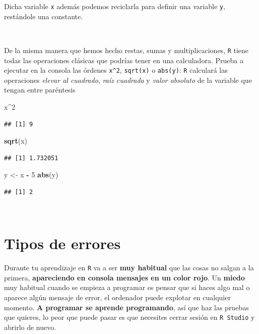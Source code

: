 \documentclass[11pt,]{book}
\newenvironment{Shaded}{\begin{snugshade}}{\end{snugshade}}
\newcommand{\DecValTok}[1]{\textcolor[rgb]{0.06,0.06,0.06}{#1}}
\newcommand{\KeywordTok}[1]{\textcolor[rgb]{0.27,0.27,0.27}{\textbf{#1}}}
\newcommand{\NormalTok}[1]{#1}
\newcommand{\OperatorTok}[1]{\textcolor[rgb]{0.43,0.43,0.43}{\textbf{#1}}}
\newcommand{\StringTok}[1]{\textcolor[rgb]{0.5,0.5,0.5}{#1}}
\begin{document}
Dicha variable \texttt{x} además podemos reciclarla para definir una variable \texttt{y}, restándole una constante.

~

De la misma manera que hemos hecho restas, sumas y multiplicaciones, \texttt{R} tiene todas las operaciones clásicas que podrías tener en una calculadora. Prueba a ejecutar en la consola las órdenes \texttt{x\^{}2}, \texttt{sqrt(x)} o \texttt{abs(y)}: \texttt{R} calculará las operaciones \emph{elevar al cuadrado}, \emph{raíz cuadrada} y \emph{valor absoluto} de la variable que tengan entre paréntesis

\begin{Shaded}
\begin{Highlighting}[]
\NormalTok{x}\OperatorTok{^}\DecValTok{2}
\end{Highlighting}
\end{Shaded}

\begin{verbatim}
## [1] 9
\end{verbatim}

\begin{Shaded}
\begin{Highlighting}[]
\KeywordTok{sqrt}\NormalTok{(x)}
\end{Highlighting}
\end{Shaded}

\begin{verbatim}
## [1] 1.732051
\end{verbatim}

\begin{Shaded}
\begin{Highlighting}[]
\NormalTok{y <-}\StringTok{ }\NormalTok{x }\OperatorTok{-}\StringTok{ }\DecValTok{5}
\KeywordTok{abs}\NormalTok{(y)}
\end{Highlighting}
\end{Shaded}

\begin{verbatim}
## [1] 2
\end{verbatim}

~

\hypertarget{tipos_errores}{%
\section{Tipos de errores}\label{tipos_errores}}

Durante tu aprendizaje en \texttt{R} va a ser \textbf{muy habitual} que las cosas no salgan a la primera, \textbf{apareciendo en consola mensajes en un color rojo}. Un \textbf{miedo} muy habitual cuando se empieza a programar es pensar que si haces algo mal o aparece algún mensaje de error, el ordenador puede explotar en cualquier momento. \textbf{A programar se aprende programando}, así que haz las pruebas que quieres, lo peor que puede pasar es que necesites cerrar sesión en \texttt{R\ Studio} y abrirlo de nuevo.
\end{document}
